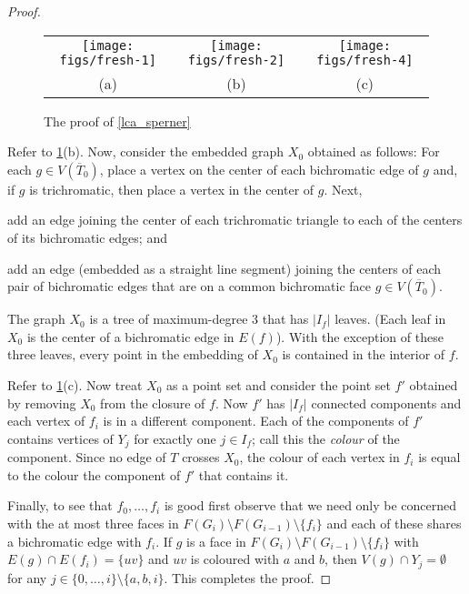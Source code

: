 \documentclass{patmorin}
\begin{document}
\begin{proof}
  \begin{figure}
    \begin{center}
      \begin{tabular}{ccc}
        \texttt{[image: figs/fresh-1]} &
        \texttt{[image: figs/fresh-2]} &
        \texttt{[image: figs/fresh-4]} \\
        (a) & (b) & (c)
      \end{tabular}
    \end{center}
    \caption{The proof of \cref{lca_sperner}}
    \label{lca_sperner_fig}
  \end{figure}

  Refer to \cref{lca_sperner_fig}(b).
  Now, consider the embedded graph $X_0$ obtained as follows: For each $g\in V(\overline{T}_0)$, place a vertex on the center of each bichromatic edge of $g$ and, if $g$ is trichromatic, then place a vertex in the center of $g$.  Next,
   \begin{compactenum}
    \item add an edge joining the center of each trichromatic triangle to each of the centers of its bichromatic edges; and
    \item add an edge (embedded as a straight line segment) joining the centers of each pair of bichromatic edges that are on a common bichromatic face $g\in V(\overline{T}_0)$.
  \end{compactenum}
  The graph $X_0$ is a tree of maximum-degree $3$ that has $|I_f|$ leaves.  (Each leaf in $X_0$ is the center of a bichromatic edge in $E(f)$).  With the exception of these three leaves, every point in the embedding of $X_0$ is contained in the interior of $f$.

  Refer to \cref{lca_sperner_fig}(c).
  Now treat $X_0$ as a point set and consider the point set $f'$ obtained by removing $X_0$ from the closure of $f$. Now $f'$ has $|I_f|$ connected components and each vertex of $f_i$ is in a different component.  Each of the components of $f'$ contains vertices of $Y_j$ for exactly one $j\in I_f$; call this the \emph{colour} of the component.  Since no edge of $T$ crosses $X_0$, the colour of each vertex in $f_i$ is equal to the colour the component of $f'$ that contains it.

  Finally, to see that $f_0,\ldots,f_i$ is good first observe that we need only be concerned with the at most three faces in $F(G_i)\setminus F(G_{i-1})\setminus\{f_i\}$ and each of these shares a bichromatic edge with $f_i$.  If $g$ is a face in $F(G_i)\setminus F(G_{i-1})\setminus\{f_i\}$ with $E(g) \cap E(f_i) = \{uv\}$ and $uv$ is coloured with $a$ and $b$, then $V(g)\cap Y_j=\emptyset$ for any $j\in\{0,\ldots,i\}\setminus\{a, b, i\}$.  This completes the proof.
\end{proof}
\end{document}
